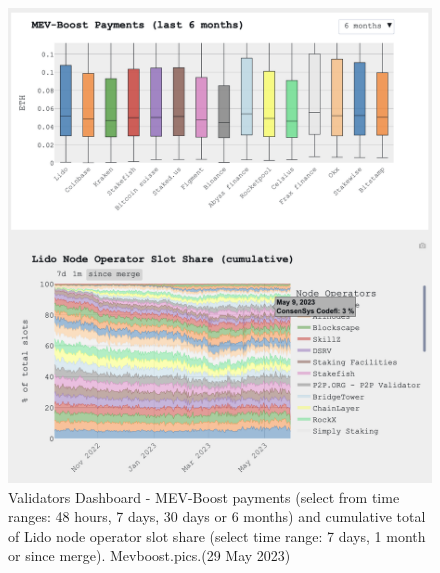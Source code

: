 \documentclass[UTF8]{article}
\begin{document}
\begin{figure}[htbp]
\begin{center}
\includegraphics[width=0.9\linewidth]{images/mevvalidator3}
\caption{Validators Dashboard - MEV-Boost payments (select from time ranges: 48 hours, 7 days, 30 days or 6 months) and cumulative total of Lido node operator slot share (select time range: 7 days, 1 month or since merge). Mevboost.pics.(29 May 2023)}
\label{fig:mevvalidator3}
\end{center}
\end{figure}
\end{document}
